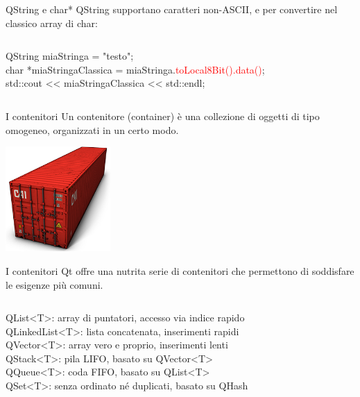 \documentclass[10pt]{beamer}
\begin{document}
\begin{frame}{QString e char*}
	QString supportano caratteri non-ASCII, e per convertire nel classico array di char:
	\begin{columns}
		\begin{block}{}
			{\ttfamily QString miaStringa = "testo";\\
				char *miaStringaClassica = miaStringa.\textcolor{red}{toLocal8Bit().data()};\\
				std::cout << miaStringaClassica << std::endl;}
		\end{block}
	\end{columns}
\end{frame}

\begin{frame}{I contenitori}
	Un contenitore (container) è una collezione di oggetti di tipo omogeneo, organizzati in un certo modo.
	
	\bigskip
	\begin{center}
		\includegraphics[height=4cm]{images/container.png}
	\end{center}
\end{frame}

\begin{frame}{I contenitori}
	Qt offre una nutrita serie di contenitori che permettono di soddisfare le esigenze più comuni.
	\bigskip
	\begin{columns}
		\column{0.85\textwidth}
		\begin{block}{}
			{\ttfamily QList<T>}: array di puntatori, accesso via indice rapido\\
			{\ttfamily QLinkedList<T>}: lista concatenata, inserimenti rapidi\\
			{\ttfamily QVector<T>}: array vero e proprio, inserimenti lenti\\
			{\ttfamily QStack<T>}: pila LIFO, basato su {\ttfamily QVector<T>}\\
			{\ttfamily QQueue<T>}: coda FIFO, basato su {\ttfamily QList<T>}\\
			{\ttfamily QSet<T>}: senza ordinato né duplicati, basato su {\ttfamily QHash}
		\end{block}
	\end{columns}
	\bigskip
\end{frame}
\end{document}

